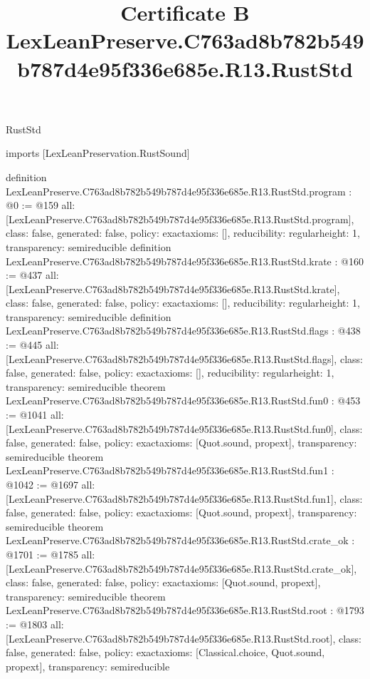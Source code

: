 \begin{lexlean}{RustStd}
\title{Certificate B LexLeanPreserve.C763ad8b782b549b787d4e95f336e685e.R13.RustStd}
\begin{coremodule}
imports [LexLeanPreservation.RustSound]

definition LexLeanPreserve.C763ad8b782b549b787d4e95f336e685e.R13.RustStd.program : @0 := @159 {
  all: [LexLeanPreserve.C763ad8b782b549b787d4e95f336e685e.R13.RustStd.program],
  class: false,
  generated: false,
  policy: exact{axioms: []},
  reducibility: regular{height: 1},
  transparency: semireducible
}
definition LexLeanPreserve.C763ad8b782b549b787d4e95f336e685e.R13.RustStd.krate : @160 := @437 {
  all: [LexLeanPreserve.C763ad8b782b549b787d4e95f336e685e.R13.RustStd.krate],
  class: false,
  generated: false,
  policy: exact{axioms: []},
  reducibility: regular{height: 1},
  transparency: semireducible
}
definition LexLeanPreserve.C763ad8b782b549b787d4e95f336e685e.R13.RustStd.flags : @438 := @445 {
  all: [LexLeanPreserve.C763ad8b782b549b787d4e95f336e685e.R13.RustStd.flags],
  class: false,
  generated: false,
  policy: exact{axioms: []},
  reducibility: regular{height: 1},
  transparency: semireducible
}
theorem LexLeanPreserve.C763ad8b782b549b787d4e95f336e685e.R13.RustStd.fun0 : @453 := @1041 {
  all: [LexLeanPreserve.C763ad8b782b549b787d4e95f336e685e.R13.RustStd.fun0],
  class: false,
  generated: false,
  policy: exact{axioms: [Quot.sound, propext]},
  transparency: semireducible
}
theorem LexLeanPreserve.C763ad8b782b549b787d4e95f336e685e.R13.RustStd.fun1 : @1042 := @1697 {
  all: [LexLeanPreserve.C763ad8b782b549b787d4e95f336e685e.R13.RustStd.fun1],
  class: false,
  generated: false,
  policy: exact{axioms: [Quot.sound, propext]},
  transparency: semireducible
}
theorem LexLeanPreserve.C763ad8b782b549b787d4e95f336e685e.R13.RustStd.crate_ok : @1701 := @1785 {
  all: [LexLeanPreserve.C763ad8b782b549b787d4e95f336e685e.R13.RustStd.crate_ok],
  class: false,
  generated: false,
  policy: exact{axioms: [Quot.sound, propext]},
  transparency: semireducible
}
theorem LexLeanPreserve.C763ad8b782b549b787d4e95f336e685e.R13.RustStd.root : @1793 := @1803 {
  all: [LexLeanPreserve.C763ad8b782b549b787d4e95f336e685e.R13.RustStd.root],
  class: false,
  generated: false,
  policy: exact{axioms: [Classical.choice, Quot.sound, propext]},
  transparency: semireducible
}


\end{coremodule}
\end{lexlean}
